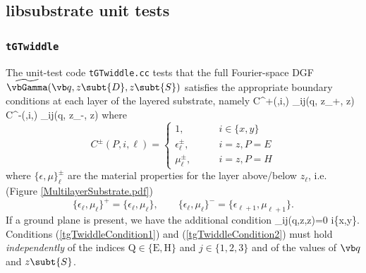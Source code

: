 \documentclass[letterpaper]{article}
\renewcommand{\wt}{\widetilde}
\begin{document}
\subsection{{\sc libsubstrate} unit tests}

\subsubsection{\texttt{tGTwiddle}}

The unit-test code \texttt{tGTwiddle.cc} tests that the full
Fourier-space DGF $\wt \vbGamma(\vb q, z\subt{D}, z\subt{S})$ satisfies the appropriate
boundary conditions at each layer of the layered substrate, namely
{ C^+(,i,\ell) \wt{\Gamma}_{ij}(\vb q, z_\ell+\eta, z)
   C^-(,i,\ell) \wt{\Gamma}_{ij}(\vb q, z_\ell-\eta, z)
}
where
$$ C^\pm(P, i, \ell)=
   \begin{cases}
    1, \qquad                 &i \in \{x,y\} \\
    \epsilon_\ell^\pm, \qquad &i=z, P=E \\
    \mu_\ell^\pm,      \qquad &i=z, P=H
   \end{cases}
$$
where $\{\epsilon,\mu\}_\ell^\pm$ are the
material properties for the layer above/below $z_\ell$, i.e.
(Figure \ref{MultilayerSubstrate.pdf})
$$ \{\epsilon_\ell, \mu_\ell\}^+ = \{\epsilon_\ell, \mu_\ell\},
   \qquad
   \{\epsilon_\ell, \mu_\ell\}^- = \{\epsilon_{\ell+1}, \mu_{\ell+1}\}.
$$
If a ground plane is present, we have the additional condition
{\wt{\Gamma}_{ij}(q,z,z)=0  i\in \{x,y\}.}
Conditions (\ref{tgTwiddleCondition1}) and (\ref{tgTwiddleCondition2})
must hold \textit{independently} of the indices $\text{Q}\in\{\text{E},\text{H}\}$
and $j\in\{1,2,3\}$ and of the values of $\vb q$ and $z\subt{S}$.

\end{document}
